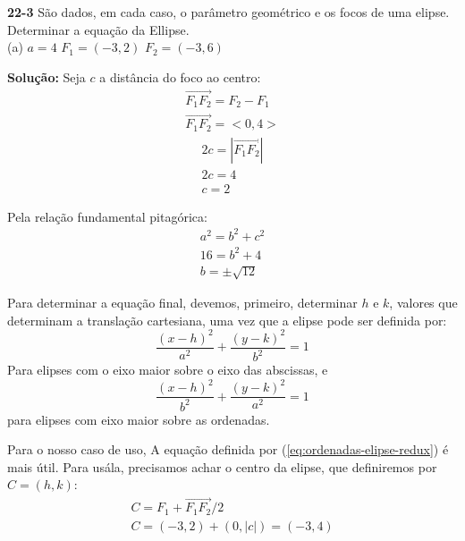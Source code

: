 \textbf{22-3} São dados, em cada caso, o parâmetro geométrico e os focos de uma elipse. Determinar a equação da Ellipse. \\
(a) $a=4$ $F_1=(-3, 2)$ $F_2=(-3, 6)$

\textbf{Solução:} Seja $c$ a distância do foco ao centro:
\begin{equation}
    \begin{split}
        \overrightarrow{F_1F_2} = F_2-F_1 \\
        \overrightarrow{F_1F_2} = <0, 4>
    \end{split}
\end{equation}
\begin{equation}
    \begin{split}
        2c=|\overrightarrow{F_1F_2}| \\
        2c = 4 \\
        c = 2
    \end{split}
\end{equation}

Pela relação fundamental pitagórica:
\begin{equation}
    \begin{split}
        a^2 = b^2 + c^2 \\
        16 = b^2 + 4 \\
        b = \pm \sqrt{12}
    \end{split}
\end{equation}

Para determinar a equação final, devemos, primeiro, determinar $h$ e $k$, valores que determinam a translação cartesiana, uma vez que a elipse pode ser definida por:
\begin{equation}
    \frac{(x - h)^2}{a^2} + \frac{(y - k)^2}{b^2} = 1
\end{equation}
Para elipses com o eixo maior sobre o eixo das abscissas, e
\begin{equation}
    \frac{(x - h)^2}{b^2} + \frac{(y - k)^2}{a^2} = 1
    \label{eq:ordenadas-elipse-redux}
\end{equation}
para elipses com eixo maior sobre as ordenadas.

Para o nosso caso de uso, A equação definida por (\ref{eq:ordenadas-elipse-redux}) é mais útil. Para usála, precisamos achar o centro da elipse, que definiremos por $C=(h, k)$:
\begin{equation}
    \begin{split}
        C = F_1 + \overrightarrow{F_1F_2}/2 \\
        C = (-3, 2) + (0, |c|) = (-3, 4)
    \end{split}
\end{equation}

